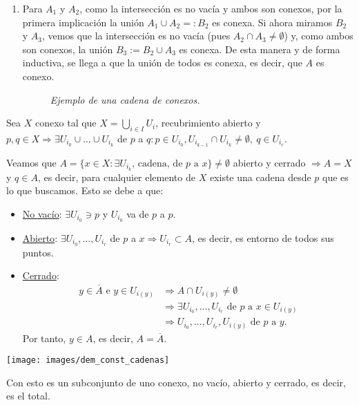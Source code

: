 \begin{demo}
\begin{enumerate}
\item Para $A_1$ y $A_2$, como la intersección es no vacía y ambos son conexos, por la primera implicación la unión $A_1 \cup A_2 =: B_2$ es conexa. Si ahora miramos $B_2$ y $A_3$, vemos que la intersección es no vacía (pues $A_2 \cap A_3\neq \emptyset$) y, como ambos son conexos, la unión $B_3 := B_2 \cup A_3$ es conexa. De esta manera y de forma inductiva, se llega a que la unión de todos es conexa, es decir, que $A$ es conexo.
\begin{figure}[H]
            \centering
            \caption{\textit{Ejemplo de una cadena de conexos.}}
            \label{fig:cadena-de-conexos}
\end{figure}
\end{enumerate}
\end{demo}

\begin{prop}
Sea $X$ conexo tal que $X = \bigcup_{i \in I} U_i$, recubrimiento abierto y $p, q \in X \Rightarrow \exists U_{i_0} \cup \ldots \cup U_{i_k}$ de $p$ a $q: p \in U_{i_0}, U_{i_{k - 1}} \cap U_{i_k} \neq \emptyset,\ q \in U_{i_r}$. 
\end{prop}
\begin{demo}
Veamos que $A = \{x \in X: \exists U_{i_k} \text{, cadena, de } p \text{ a } x\} \neq \emptyset$ abierto y cerrado $\Rightarrow A = X$ y $q \in A$, es decir, para cualquier elemento de $X$ existe una cadena desde $p$ que es lo que buscamos. Esto se debe a que: 
\begin{itemize}
    \item \underline{No vacío}: $\exists U_{i_0} \ni p$ y $U_{i_0}$ va de $p$ a $p$.
    \item \underline{Abierto}: $\exists U_{i_0}, \ldots, U_{i_r}$ de $p$ a $x \Rightarrow U_{i_r} \subset A$, es decir, es entorno de todos sus puntos.
    \item \underline{Cerrado}: 
    \begin{align*}
        y \in \overline{A} \text{ e } y \in U_{i\left( y \right)} &\Rightarrow A \cap U_{i\left( y \right)} \neq \emptyset\\
        &\Rightarrow \exists U_{i_0}, \ldots, U_{i_r} \text{ de } p \text{ a } x\in U_{i\left( y \right)}\\
        &\Rightarrow U_{i_0}, \ldots, U_{i_r}, U_{i\left( y \right)} \text{ de } p \text{ a } y
    .\end{align*}
    Por tanto, $y \in A$, es decir, $A = \overline{A}$.
\end{itemize}
\begin{center}
    \texttt{[image: images/dem\_const\_cadenas]} 
\end{center}
Con esto es un subconjunto de uno conexo, no vacío, abierto y cerrado, es decir, es el total.
\end{demo}

